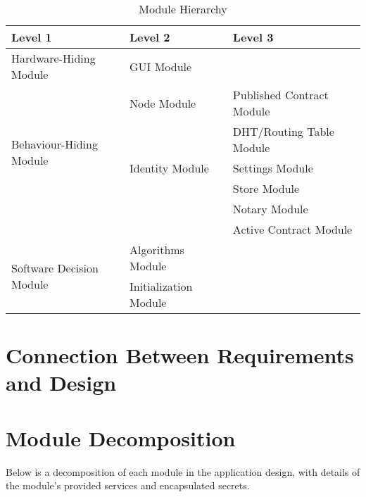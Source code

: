 \documentclass{article}
\begin{document}
\begin{table}[h!]
	\centering
	\begin{tabular}{p{} p{} p{}}
		\toprule
		\textbf{Level 1} & \textbf{Level 2} & \textbf{Level 3}\\
		\midrule
		
		{Hardware-Hiding Module} & GUI Module & ~ \\
		\midrule
		
		\multirow{5}{0.4\textwidth}{Behaviour-Hiding Module} & Node Module & Published Contract Module \\
		& ~ & DHT/Routing Table Module\\
		& Identity Module & Settings Module\\
		& ~ & Store Module\\
		& ~ & Notary Module\\
		& ~ & Active Contract Module\\
		\midrule
		
		\multirow{3}{0.4\textwidth}{Software Decision Module} & Algorithms Module & ~ \\
		& Initialization Module & ~ \\
		\bottomrule
		
	\end{tabular}
	\caption{Module Hierarchy}
	\label{TblMH}
\end{table}



\section*{Connection Between Requirements and Design}

\section*{Module Decomposition}
Below is a decomposition of each module in the application design, with details of the module's provided services and encapsulated secrets.
\end{document}
